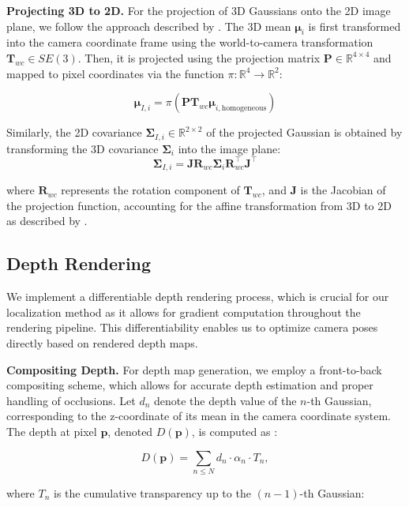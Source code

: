 \documentclass[twocolumn]{article} %
\begin{document}
\textbf{Projecting 3D to 2D.} For the projection of 3D Gaussians onto
the 2D image plane, we follow the approach described by
\cite{kerbl3DGaussianSplatting2023}. The 3D mean
\(\boldsymbol{\mu}_i\) is first transformed into the camera coordinate
frame using the world-to-camera transformation
\(\mathbf{T}_{wc} \in SE(3)\). Then, it is projected using the
projection matrix \(\mathbf{P} \in \mathbb{R}^{4 \times 4}\) and mapped
to pixel coordinates via the function
\(\pi: \mathbb{R}^4 \rightarrow \mathbb{R}^2\):

\[
\boldsymbol{\mu}_{I,i} = \pi\left( \mathbf{P} \mathbf{T}_{wc} \boldsymbol{\mu}_{i,\text{homogeneous}} \right)
\]

Similarly, the 2D covariance
\(\boldsymbol{\Sigma}_{I,i} \in \mathbb{R}^{2\times2}\) of the projected
Gaussian is obtained by transforming the 3D covariance
\(\boldsymbol{\Sigma}_i\) into the image plane: \[
\boldsymbol{\Sigma}_{I,i} = \mathbf{J} \mathbf{R}_{wc} \boldsymbol{\Sigma}_i \mathbf{R}_{wc}^\top \mathbf{J}^\top
\]

where \(\mathbf{R}_{wc}\) represents the rotation component of
\(\mathbf{T}_{wc}\), and \(\mathbf{J}\) is the Jacobian of the
projection function, accounting for the affine transformation from 3D to
2D as described by \cite{zwickerEWASplatting2002}.

\subsection{Depth Rendering}\label{depth-rendering}

We implement a differentiable depth rendering process, which is crucial
for our localization method as it allows for gradient computation
throughout the rendering pipeline. This differentiability enables us to
optimize camera poses directly based on rendered depth maps.

\textbf{Compositing Depth.} For depth map generation, we employ a
front-to-back compositing scheme, which allows for accurate depth
estimation and proper handling of occlusions. Let \(d_n\) denote the
depth value of the \(n\)-th Gaussian, corresponding to the z-coordinate
of its mean in the camera coordinate system. The depth at pixel
\(\mathbf{p}\), denoted \(D(\mathbf{p})\), is computed as
\cite{kerbl3DGaussianSplatting2023}:

\[D(\mathbf{p}) = \sum_{n \leq N} d_n \cdot \alpha_n \cdot T_n,\]

where \(T_n\) is the cumulative transparency up to the \((n-1)\)-th
Gaussian:
\end{document}
